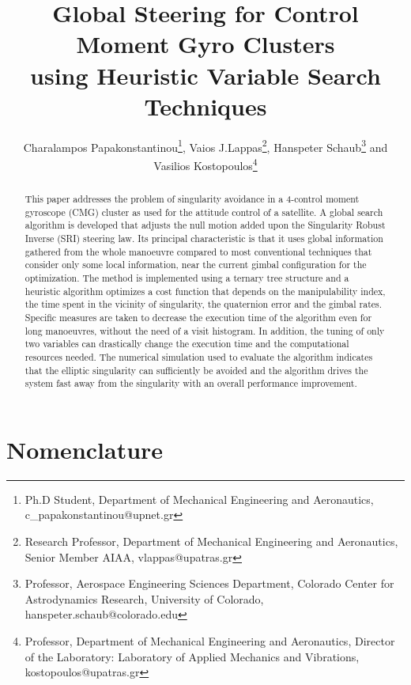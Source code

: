 \documentclass[journal]{new-aiaa}
\title{Global Steering for Control Moment Gyro Clusters\\ using Heuristic Variable Search Techniques}
\author{Charalampos Papakonstantinou\footnote{Ph.D Student, Department of Mechanical Engineering and Aeronautics, c\_papakonstantinou@upnet.gr}, Vaios J.Lappas\footnote{Research Professor, Department of Mechanical Engineering and Aeronautics, Senior Member AIAA, vlappas@upatras.gr}, Hanspeter Schaub\footnote{Professor, Aerospace Engineering Sciences Department, Colorado Center for Astrodynamics Research, University of Colorado, hanspeter.schaub@colorado.edu} and Vasilios Kostopoulos\footnote{Professor, Department of Mechanical Engineering and Aeronautics, Director of the Laboratory: Laboratory of Applied Mechanics and Vibrations, kostopoulos@upatras.gr}}
\affil{University of Patras, Rio, Greece, 26504}
\begin{document}
\maketitle

\begin{abstract}
This paper addresses the problem of singularity avoidance in a 4-control moment gyroscope (CMG) cluster as used for the attitude control of a satellite. A global search algorithm is developed that adjusts the null motion added upon the Singularity Robust Inverse (SRI) steering law. Its principal characteristic is that it uses global information gathered from the whole manoeuvre compared to most conventional techniques that consider only some local information, near the current gimbal configuration for the optimization.  The method is implemented using a ternary tree structure and a heuristic algorithm optimizes a cost function that depends on the manipulability index, the time spent in the vicinity of singularity, the quaternion error and the gimbal rates. Specific measures are taken to decrease the execution time of the algorithm even for long manoeuvres, without the need of a visit histogram. In addition, the tuning of only two variables can drastically change the execution time and the computational resources needed. The numerical simulation used to evaluate the algorithm indicates that the elliptic singularity can sufficiently be avoided and the algorithm drives the system fast away from the singularity with an overall performance improvement.
\end{abstract}
\section*{Nomenclature}
\end{document}
